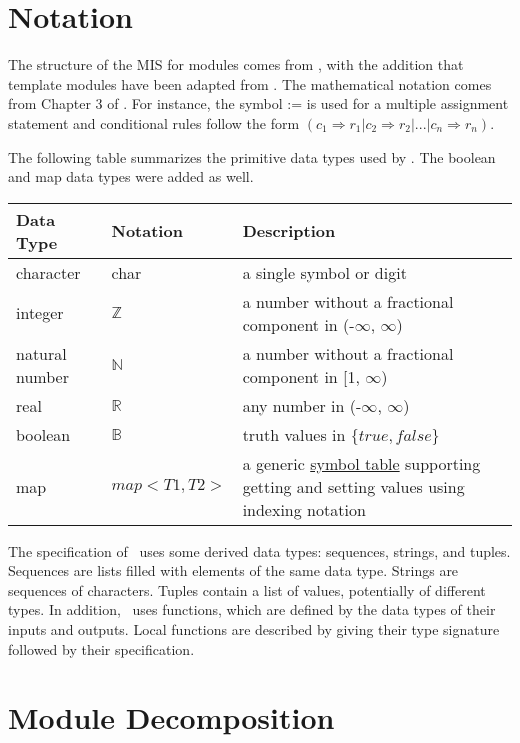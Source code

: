 \documentclass[12pt, titlepage]{article}
\begin{document}
\section{Notation}

The structure of the MIS for modules comes from \citet{HoffmanAndStrooper1995},
with the addition that template modules have been adapted from
\cite{GhezziEtAl2003}.  The mathematical notation comes from Chapter 3 of
\citet{HoffmanAndStrooper1995}.  For instance, the symbol := is used for a
multiple assignment statement and conditional rules follow the form $(c_1
\Rightarrow r_1 | c_2 \Rightarrow r_2 | ... | c_n \Rightarrow r_n )$.

The following table summarizes the primitive data types used by \progname. The boolean and map data types were added as well.

\begin{center}
\renewcommand{\arraystretch}{1.2}
\noindent 
\begin{tabular}{l l p{7.5cm}} 
\toprule 
\textbf{Data Type} & \textbf{Notation} & \textbf{Description}\\ 
\midrule
character & char & a single symbol or digit\\
integer & $\mathbb{Z}$ & a number without a fractional component in (-$\infty$, $\infty$) \\
natural number & $\mathbb{N}$ & a number without a fractional component in [1, $\infty$) \\
real & $\mathbb{R}$ & any number in (-$\infty$, $\infty$)\\
boolean & $\mathbb{B}$ & truth values in $\{true, false\}$\\
map &  $map<T1, T2>$ & a generic \href{https://en.wikipedia.org/wiki/Symbol_table}{symbol table} supporting getting and setting values using indexing notation\\
\bottomrule
\end{tabular} 
\end{center}

\noindent
The specification of \progname \ uses some derived data types: sequences, strings, and
tuples. Sequences are lists filled with elements of the same data type. Strings
are sequences of characters. Tuples contain a list of values, potentially of
different types. In addition, \progname \ uses functions, which
are defined by the data types of their inputs and outputs. Local functions are
described by giving their type signature followed by their specification.

\section{Module Decomposition}
\end{document}
